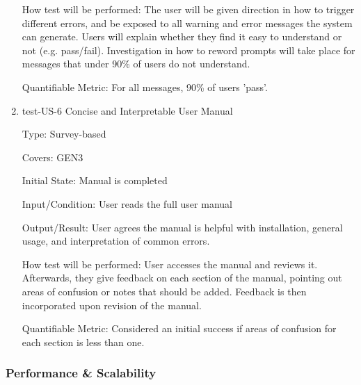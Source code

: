 \documentclass[12pt, titlepage]{article}
\begin{document}
\begin{enumerate}
How test will be performed: The user will be given direction in how to trigger different errors, and be exposed to
all warning and error messages the system can generate. Users will explain whether they find it easy to understand
or not (e.g. pass/fail). Investigation in how to reword prompts will take place for messages that under 90\% of users
do not understand.

Quantifiable Metric: For all messages, 90\% of users 'pass'.

\item{test-US-6 Concise and Interpretable User Manual\\}

Type: Survey-based

Covers: GEN3 %
					
Initial State: Manual is completed
					
Input/Condition: User reads the full user manual
					
Output/Result: User agrees the manual is helpful with installation, general usage, and interpretation of common errors.
					
How test will be performed: User accesses the manual and reviews it. Afterwards, they give feedback on each section of 
the manual, pointing out areas of confusion or notes that should be added. Feedback is then incorporated upon revision
of the manual.

Quantifiable Metric: Considered an initial success if areas of confusion for each section is less than one.

\end{enumerate}

\subsubsection{Performance \& Scalability}
\end{document}
